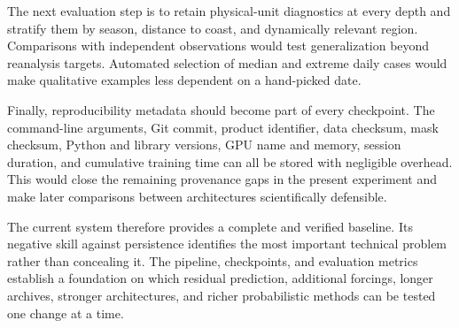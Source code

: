 The next evaluation step is to retain physical-unit diagnostics at every depth and stratify them by season, distance to coast, and dynamically relevant region. Comparisons with independent observations would test generalization beyond reanalysis targets. Automated selection of median and extreme daily cases would make qualitative examples less dependent on a hand-picked date.

Finally, reproducibility metadata should become part of every checkpoint. The command-line arguments, Git commit, product identifier, data checksum, mask checksum, Python and library versions, GPU name and memory, session duration, and cumulative training time can all be stored with negligible overhead. This would close the remaining provenance gaps in the present experiment and make later comparisons between architectures scientifically defensible.

The current system therefore provides a complete and verified baseline. Its negative skill against persistence identifies the most important technical problem rather than concealing it. The pipeline, checkpoints, and evaluation metrics establish a foundation on which residual prediction, additional forcings, longer archives, stronger architectures, and richer probabilistic methods can be tested one change at a time.
